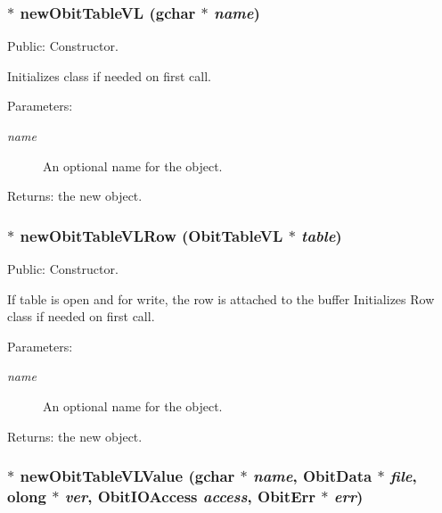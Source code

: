 \subsubsection{$\ast$ new\-Obit\-Table\-VL (gchar $\ast$ {\em name})}\label{ObitTableVL_8c_a16}


Public: Constructor. 

Initializes class if needed on first call. \begin{Desc}
\item[Parameters:]
\begin{description}
\item[{\em name}]An optional name for the object. \end{description}
\end{Desc}
\begin{Desc}
\item[Returns:]the new object. \end{Desc}
\subsubsection{$\ast$ new\-Obit\-Table\-VLRow ({\bf Obit\-Table\-VL} $\ast$ {\em table})}\label{ObitTableVL_8c_a14}


Public: Constructor. 

If table is open and for write, the row is attached to the buffer Initializes Row class if needed on first call. \begin{Desc}
\item[Parameters:]
\begin{description}
\item[{\em name}]An optional name for the object. \end{description}
\end{Desc}
\begin{Desc}
\item[Returns:]the new object. \end{Desc}
\subsubsection{$\ast$ new\-Obit\-Table\-VLValue (gchar $\ast$ {\em name}, {\bf Obit\-Data} $\ast$ {\em file}, {\bf olong} $\ast$ {\em ver}, Obit\-IOAccess {\em access}, {\bf Obit\-Err} $\ast$ {\em err})}\label{ObitTableVL_8c_a18}


